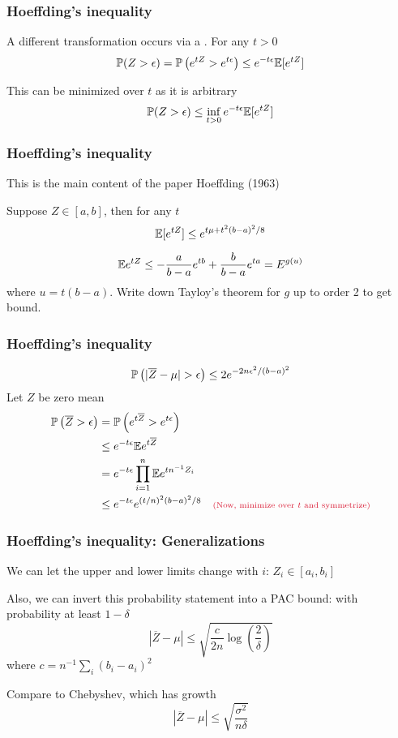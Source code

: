 \documentclass[12pt]{beamer}
\newcommand{\parenthetical}[2]{#1  \scriptstyle \alr{( #2)}}
\begin{document}
\begin{frame}[fragile]
\frametitle{Hoeffding's inequality}
A different transformation occurs via a .  For any $t > 0$
\[
\P(Z > \epsilon) = \P\left( e^{tZ} > e^{t\epsilon}\right) \leq e^{-t\epsilon}\E[e^{tZ}]
\]

\vsp
This can be minimized over $t$ as it is arbitrary
\[
\P(Z > \epsilon)  \leq \inf_{t > 0} e^{-t\epsilon}\E[e^{tZ}]
\]
\end{frame}

\begin{frame}[fragile]
\frametitle{Hoeffding's inequality}
This is the main content of the paper Hoeffding (1963)

\vsp
{}
 Suppose $Z \in [a,b]$, then for any $t$
\[
\E[e^{tZ}] \leq e^{t\mu + t^2(b-a)^2/8}
\]

\vsp
{} 
\[
\E e^{tZ} \leq -\frac{a}{b-a}e^{tb} + \frac{b}{b-a}e^{ta} = E^{g(u)}
\]
where $u = t(b-a)$. Write down Tayloy's theorem for $g$ up to order 2 to get bound.

\end{frame}

\begin{frame}[fragile]
\frametitle{Hoeffding's inequality}
\[
\P\left( |\overline{Z} - \mu| > \epsilon\right) \leq 2e^{-2n\epsilon^2/(b-a)^2}
\]
 Let $Z$ be zero mean
\begin{align*}
\P\left( \overline{Z} > \epsilon\right)
& 
=
\P\left( e^{t\overline{Z}} > e^{t\epsilon}\right) \\
& \leq e^{-t\epsilon} \E e^{t\overline{Z}} \\
& = e^{-t\epsilon} \prod_{i=1}^n\E e^{tn^{-1}Z_i} \\
& \leq
e^{-t\epsilon}e^{(t/n)^2(b-a)^2/8} \parenthetical{\quad}{\textrm{Now, minimize over $t$ and symmetrize}}
\end{align*}
\end{frame}

\begin{frame}[fragile]
\frametitle{Hoeffding's inequality: Generalizations}
We can let the upper and lower limits change with $i$: $Z_i \in [a_i,b_i]$

\vsp
Also, we can invert this probability statement into a PAC bound:  with probability at least $1-\delta$
\[
|\overline{Z} - \mu| \leq \sqrt{\frac{c}{2n}\log\left(\frac{2}{\delta}\right)}
\]
where $c = n^{-1}\sum_i (b_i - a_i)^2$

\vsp
Compare to Chebyshev, which has growth
\[
|\overline{Z} - \mu| \leq \sqrt{\frac{\sigma^2}{n\delta}}
\]
\end{frame}
\end{document}
